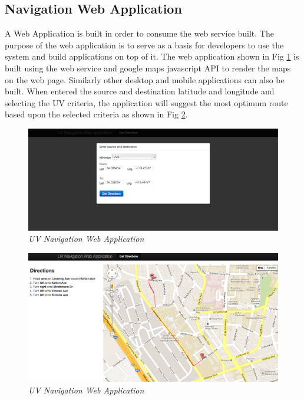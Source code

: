 \documentclass[12pt,fullpage,doublespace]{article}
\begin{document}
\newpage
\subsection{Navigation Web Application}
A Web Application is built in order to consume the web service built. The purpose of the web application is to serve as a basis for developers to use the system and build applications on top of it. The web application shown in Fig \ref{fig:webappx} is built using the web service and google maps javascript API to render the maps on the web page. Similarly other desktop and mobile applications can also be built. When entered the source and destination latitude and longitude and selecting the UV criteria, the application will suggest the most optimum route based upon the selected criteria as shown in Fig \ref{fig:webapp2}.
\begin{figure}[ht]
\begin{center}
\includegraphics[scale=0.30]{webapp1.png}
\caption{\small \sl  UV Navigation Web Application }
\label{fig:webappx}
\end{center}
\end{figure}
\begin{figure}[ht]
\begin{center}
\includegraphics[scale=0.35]{webapp2.png}
\caption{\small \sl UV Navigation Web Application }
\label{fig:webapp2}
\end{center}
\end{figure}
\clearpage
\newpage
\end{document}
